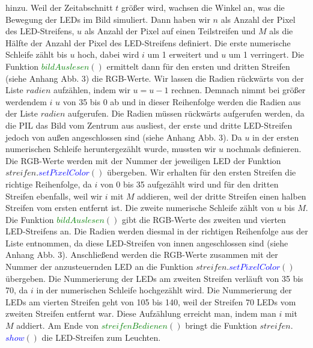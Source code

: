 \documentclass [a4paper, 11pt] {article}
\begin{document}
hinzu. Weil der Zeitabschnitt {$t$} größer wird, wachsen die Winkel an, was die Bewegung der LEDs im Bild simuliert. Dann haben wir {$n$} als Anzahl der Pixel des LED-Streifens, {$u$} als Anzahl der Pixel auf einen Teilstreifen und {$M$} als die Hälfte der Anzahl der Pixel des LED-Streifens definiert. Die erste numerische Schleife zählt bis {$u$} hoch, dabei wird {$i$} um 1 erweitert und {$u$}  um 1 verringert. Die Funktion \textcolor{green}{$bildAuslesen$}{$()$} ermittelt dann für den ersten und dritten Streifen (siehe Anhang Abb. 3) die RGB-Werte. Wir lassen die Radien rückwärts von der Liste {$radien$} aufzählen, indem wir {$u = u - 1$} rechnen. Demnach nimmt bei größer werdendem {$i$} {$u$} von 35 bis 0 ab und in dieser Reihenfolge werden die Radien aus der Liste {$radien$} aufgerufen. Die Radien müssen rückwärts aufgerufen werden, da die PIL das Bild vom Zentrum aus ausliest, der erste und dritte LED-Streifen jedoch von außen angeschlossen sind (siehe Anhang Abb. 3). Da {$u$} in der ersten numerischen Schleife heruntergezählt wurde, mussten wir {$u$} nochmals definieren. Die RGB-Werte werden mit der Nummer der jeweiligen LED der Funktion {$streifen.$}\textcolor{blue}{$setPixelColor$}{$()$} übergeben. Wir erhalten für den ersten Streifen die richtige Reihenfolge, da {$i$} von 0 bis 35 aufgezählt wird und für den dritten Streifen ebenfalls, weil wir {$i$} mit {$M$} addieren, weil der dritte Streifen einen halben Streifen vom ersten entfernt ist. Die zweite numerische Schleife zählt von {$u$} bis {$M$}. Die Funktion \textcolor{green}{$bildAuslesen$}{$()$} gibt die RGB-Werte des zweiten und vierten LED-Streifens an. Die Radien werden diesmal in der richtigen Reihenfolge aus der Liste entnommen, da diese LED-Streifen von innen angeschlossen sind (siehe Anhang Abb. 3). Anschließend werden die RGB-Werte zusammen mit der Nummer der anzusteuernden LED an die Funktion {$streifen.$}\textcolor{blue}{$setPixelColor$}{$()$} übergeben. Die Nummerierung der LEDs am zweiten Streifen verläuft von 35 bis 70, da {$i$} in der numerischen Schleife hochgezählt wird. Die Nummerierung der LEDs am vierten Streifen geht von 105 bis 140, weil der Streifen 70 LEDs vom zweiten Streifen entfernt war. Diese Aufzählung erreicht man, indem man {$i$} mit {$M$} addiert. Am Ende von \textcolor{green}{$streifenBedienen$}{$()$} bringt die Funktion {$streifen.$}\textcolor{blue}{$show$}{$()$} die LED-Streifen zum Leuchten.
\end{document}
